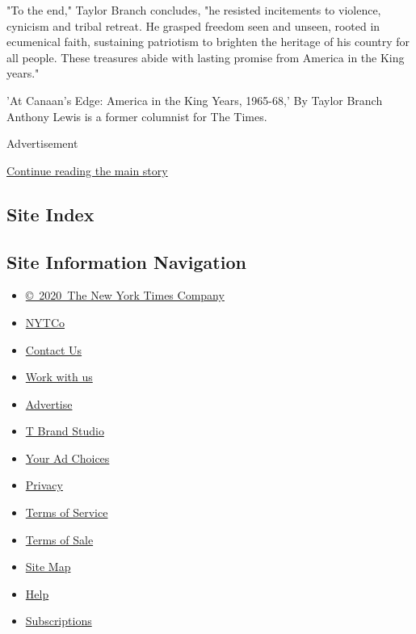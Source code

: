 "To the end," Taylor Branch concludes, "he resisted incitements to
violence, cynicism and tribal retreat. He grasped freedom seen and
unseen, rooted in ecumenical faith, sustaining patriotism to brighten
the heritage of his country for all people. These treasures abide with
lasting promise from America in the King years."

'At Canaan's Edge: America in the King Years, 1965-68,' By Taylor Branch
Anthony Lewis is a former columnist for The Times.

Advertisement

\protect\hyperlink{after-bottom}{Continue reading the main story}

\hypertarget{site-index}{%
\subsection{Site Index}\label{site-index}}

\hypertarget{site-information-navigation}{%
\subsection{Site Information
Navigation}\label{site-information-navigation}}

\begin{itemize}
\tightlist
\item
  \href{https://help.nytimes.com/hc/en-us/articles/115014792127-Copyright-notice}{©~2020~The
  New York Times Company}
\end{itemize}

\begin{itemize}
\tightlist
\item
  \href{https://www.nytco.com/}{NYTCo}
\item
  \href{https://help.nytimes.com/hc/en-us/articles/115015385887-Contact-Us}{Contact
  Us}
\item
  \href{https://www.nytco.com/careers/}{Work with us}
\item
  \href{https://nytmediakit.com/}{Advertise}
\item
  \href{http://www.tbrandstudio.com/}{T Brand Studio}
\item
  \href{https://www.nytimes.com/privacy/cookie-policy\#how-do-i-manage-trackers}{Your
  Ad Choices}
\item
  \href{https://www.nytimes.com/privacy}{Privacy}
\item
  \href{https://help.nytimes.com/hc/en-us/articles/115014893428-Terms-of-service}{Terms
  of Service}
\item
  \href{https://help.nytimes.com/hc/en-us/articles/115014893968-Terms-of-sale}{Terms
  of Sale}
\item
  \href{https://spiderbites.nytimes.com}{Site Map}
\item
  \href{https://help.nytimes.com/hc/en-us}{Help}
\item
  \href{https://www.nytimes.com/subscription?campaignId=37WXW}{Subscriptions}
\end{itemize}
